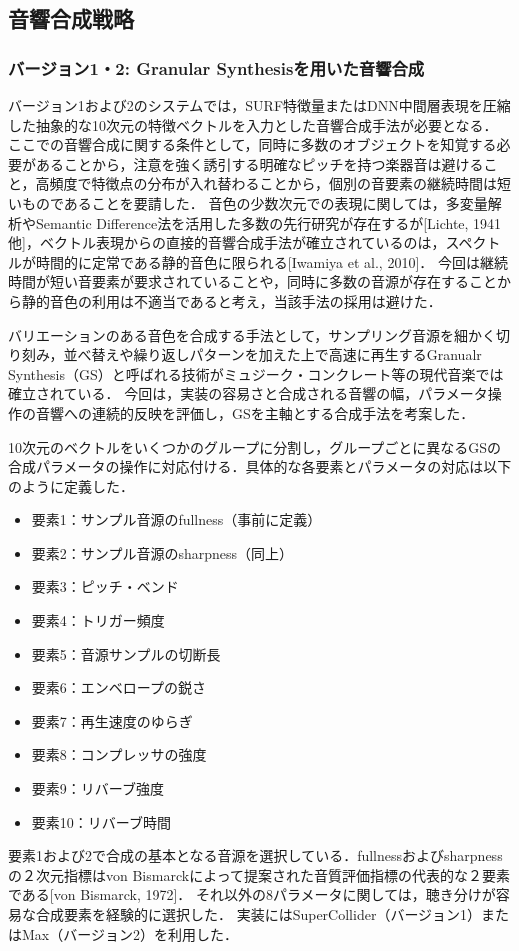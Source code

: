 \subsection{音響合成戦略}

\subsubsection{バージョン1・2: Granular Synthesisを用いた音響合成}
バージョン1および2のシステムでは，SURF特徴量またはDNN中間層表現を圧縮した抽象的な10次元の特徴ベクトルを入力とした音響合成手法が必要となる．
ここでの音響合成に関する条件として，同時に多数のオブジェクトを知覚する必要があることから，注意を強く誘引する明確なピッチを持つ楽器音は避けること，高頻度で特徴点の分布が入れ替わることから，個別の音要素の継続時間は短いものであることを要請した．
音色の少数次元での表現に関しては，多変量解析やSemantic Difference法を活用した多数の先行研究が存在するが[Lichte, 1941他]，ベクトル表現からの直接的音響合成手法が確立されているのは，スペクトルが時間的に定常である静的音色に限られる[Iwamiya et al., 2010]．
今回は継続時間が短い音要素が要求されていることや，同時に多数の音源が存在することから静的音色の利用は不適当であると考え，当該手法の採用は避けた．

バリエーションのある音色を合成する手法として，サンプリング音源を細かく切り刻み，並べ替えや繰り返しパターンを加えた上で高速に再生するGranualr Synthesis（GS）と呼ばれる技術がミュジーク・コンクレート等の現代音楽では確立されている．
今回は，実装の容易さと合成される音響の幅，パラメータ操作の音響への連続的反映を評価し，GSを主軸とする合成手法を考案した．

10次元のベクトルをいくつかのグループに分割し，グループごとに異なるGSの合成パラメータの操作に対応付ける．具体的な各要素とパラメータの対応は以下のように定義した．
\begin{itemize}
\item 要素1：サンプル音源のfullness（事前に定義）
\item 要素2：サンプル音源のsharpness（同上）
\item 要素3：ピッチ・ベンド
\item 要素4：トリガー頻度
\item 要素5：音源サンプルの切断長
\item 要素6：エンベロープの鋭さ
\item 要素7：再生速度のゆらぎ
\item 要素8：コンプレッサの強度
\item 要素9：リバーブ強度
\item 要素10：リバーブ時間
\end{itemize}
要素1および2で合成の基本となる音源を選択している．fullnessおよびsharpnessの２次元指標はvon Bismarckによって提案された音質評価指標の代表的な２要素である[von Bismarck, 1972]．
それ以外の8パラメータに関しては，聴き分けが容易な合成要素を経験的に選択した．
実装にはSuperCollider（バージョン1）またはMax（バージョン2）を利用した．

